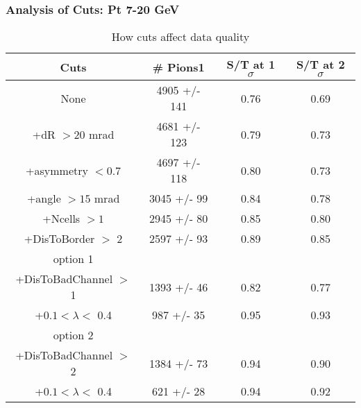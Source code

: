 \frame
{
\frametitle{Analysis of Cuts: Pt 7-20 GeV}
\begin{table}
\caption{How cuts affect data quality}
\centering
\begin{tabular}{c c c c}
\hline\hline
Cuts & \# Pions1 & S/T at 1 $\sigma$ & S/T at 2 $\sigma$ \\ [0.5ex]
\hline
None & 4905 +/-  141 & 0.76 & 0.69 \\ %
+dR $> 20$ mrad & 4681 +/-  123 & 0.79 & 0.73 \\ %
+asymmetry $< 0.7$ & 4697 +/-  118 & 0.80 & 0.73 \\ %
+angle $> 15$ mrad & 3045 +/-   99 & 0.84 & 0.78 \\ %
+Ncells $> 1$& 2945 +/-   80 & 0.85 & 0.80 \\ %
+DisToBorder $>$ 2 & 2597 +/-   93 & 0.89 & 0.85 \\ %
option 1\\
+DisToBadChannel $>$ 1& 1393 +/-   46 & 0.82 & 0.77 \\ %
+$0.1 < \lambda <$ 0.4 &  987 +/-   35 & 0.95 & 0.93 \\ %
option 2\\
+DisToBadChannel $>$ 2& 1384 +/-   73 & 0.94 & 0.90 \\ %
+$0.1 < \lambda <$ 0.4 &  621 +/-   28 & 0.94 & 0.92 \\ %
[1ex]
\hline
\end{tabular}
\label{table:nonlin}
\end{table}
}
